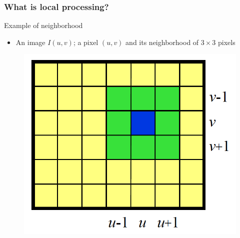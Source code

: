 \documentclass[english,11pt,table,handout]{beamer}
\begin{document}
\frame
{
	\frametitle{What is local processing?}
	\begin{block}{Example of neighborhood}
		\begin{itemize}
			\item An image $I(u,v)$; a pixel $(u,v)$ and its neighborhood of $3\times 3 $ pixels
		\end{itemize}
	\end{block}
	\centering
	\begin{figure}[!h]
		\includegraphics[scale=0.5]{neighborhood.png}
	\end{figure}
}
\end{document}
